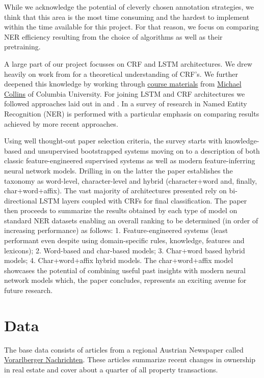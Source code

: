 \documentclass[11pt]{article}
\begin{document}
While we acknowledge the potential of cleverly chosen annotation strategies, we think that this area is the most time consuming and the hardest to implement within the time available for this project. For that reason, we focus on comparing NER efficiency resulting from the choice of algorithms as well as their pretraining. 

A large part of our project focusses on CRF and LSTM architectures. We drew heavily on work from \citet{MAL-013} for a theoretical understanding of CRF's. We further deepened this knowledge by working through \href{http://www.cs.columbia.edu/~mcollins/crf.pdf}{course materials} from \href{http://www.cs.columbia.edu/~mcollins/}{Michael Collins} of Columbia University. For joining LSTM and CRF architectures we followed approaches laid out in \citet{DBLP:journals/corr/HuangXY15} and \citet{lample-etal-2016-neural}. In \citet{yadav-bethard-2018-survey} a survey of research in Named Entity Recognition (NER) is performed with a particular emphasis on comparing results achieved by more recent approaches. 

Using well thought-out paper selection criteria, the survey starts with knowledge-based and unsupervised bootstrapped systems moving on to a description of both classic feature-engineered supervised systems as well as modern feature-inferring neural network models. Drilling in on the latter the paper establishes the taxonomy as word-level, character-level and hybrid (character+word and, finally, char+word+affix). The vast majority of architectures presented rely on bi-directional LSTM layers coupled with CRFs for final classification. The paper then proceeds to summarize the results obtained by each type of model on standard NER datasets enabling an overall ranking to be determined (in order of increasing performance) as follows: 1. Feature-engineered systems (least performant even despite using domain-specific rules, knowledge, features and lexicons); 2. Word-based and char-based models; 3. Char+word based hybrid models; 4. Char+word+affix hybrid models. The char+word+affix model showcases the potential of combining useful past insights with modern neural network models which, the paper concludes, represents an exciting avenue for future research.

\section{Data}

The base data consists of articles from a regional Austrian Newspaper called \href{https://www.vn.at/tags/grund-und-boden}{Vorarlberger Nachrichten}. These articles summarize recent changes in ownership in real estate and cover about a quarter of all property transactions. 
\end{document}
